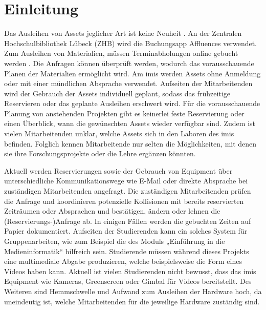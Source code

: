 
\chapter{Einleitung}

Das Ausleihen von Assets jeglicher Art ist keine Neuheit . An der Zentralen
Hochschulbibliothek Lübeck (ZHB) wird die Buchungsapp Affluences verwendet. Zum Ausleihen von
Materialien, müssen Terminabholungen online gebucht werden . Die Anfragen können
überprüft werden, wodurch das vorausschauende Planen der Materialien ermöglicht wird. Am \ac{imis}
werden Assets ohne Anmeldung oder mit einer mündlichen Absprache verwendet. Aufseiten der
Mitarbeitenden wird der Gebrauch der Assets individuell geplant, sodass das frühzeitige Reservieren
oder das geplante Ausleihen erschwert wird. Für die vorausschauende Planung von anstehenden
Projekten gibt es keinerlei feste Reservierung oder einen Überblick, wann die gewünschten Assets
wieder verfügbar sind. Zudem ist vielen Mitarbeitenden unklar, welche Assets sich in den Laboren des
\ac{imis} befinden. Folglich kennen Mitarbeitende nur selten die Möglichkeiten, mit denen sie ihre
Forschungsprojekte oder die Lehre ergänzen könnten.

Aktuell werden Reservierungen sowie der Gebrauch von Equipment über unterschiedliche
Kommunikationswege wie E-Mail oder direkte Absprache bei zuständigen Mitarbeitenden angefragt. Die
zuständigen Mitarbeitenden prüfen die Anfrage und koordinieren potenzielle Kollisionen mit bereits
reservierten Zeiträumen oder Absprachen und bestätigen, ändern oder lehnen die
(Reservierungs-)Anfrage ab. In einigen Fällen werden die gebuchten Zeiten auf Papier dokumentiert.
Aufseiten der Studierenden kann ein solches System für Gruppenarbeiten, wie zum Beispiel die des Moduls
„Einführung in die Medieninformatik“ hilfreich sein. Studierende müssen während dieses Projekts eine
multimediale Abgabe produzieren, welche beispielsweise die Form eines Videos haben kann. Aktuell ist
vielen Studierenden nicht bewusst, dass das \ac{imis} Equipment wie Kameras, Greenscreen oder Gimbal für
Videos bereitstellt. Des Weiteren sind Hemmschwelle und Aufwand zum Ausleihen der Hardware hoch, da
uneindeutig ist, welche Mitarbeitenden für die jeweilige Hardware zuständig sind.


